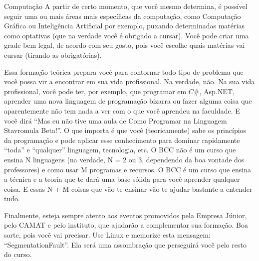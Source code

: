 \begin{subsecao}{Computação}
A partir de certo momento, que você mesmo determina, é possível seguir uma
ou mais áreas mais específicas da computação, como Computação Gráfica ou
Inteligência Artificial por exemplo, puxando determinadas matérias como
optativas (que na verdade você é obrigado a cursar). Você pode criar uma grade
bem legal, de acordo com seu gosto, pois você escolhe quais matérias vai
cursar (tirando as obrigatórias).

Essa formação teórica prepara você para contornar todo tipo de problema que
você possa vir a encontrar em sua vida profissional. Na verdade, não. Na sua
vida profissional, você pode ter, por exemplo, que programar em $C\#$, Asp.NET,
aprender uma nova linguagem de programação bizarra ou fazer alguma coisa que
aparentemente não tem nada a ver com o que você aprendeu na faculdade. E você
dirá ``Mas eu não tive uma aula de Como Programar na Linguagem Stavromula
Beta!''. O que importa é que você (teoricamente) sabe os princípios da
programação e pode aplicar esse conhecimento para dominar rapidamente ``toda''
e ``qualquer'' linguagem, tecnologia, etc. O BCC não é um curso que ensina N
linguagens (na verdade, N = 2 ou 3, dependendo da boa vontade dos professores) e
como usar M programas e recursos. O BCC é um curso que ensina a técnica e a
teoria que te dará uma base sólida para você aprender qualquer
coisa. E essas N + M coisas que vão te ensinar vão te ajudar bastante a
entender tudo.

Finalmente, esteja sempre atento aos eventos promovidos pela Empresa Júnior,
pelo CAMAT e pelo instituto, que ajudarão a complementar sua formação. Boa
sorte, pois você vai precisar. Use Linux e memorize esta
mensagem: ``SegmentationFault''. Ela será uma assombração que perseguirá você
pelo resto do curso.

\end{subsecao}
